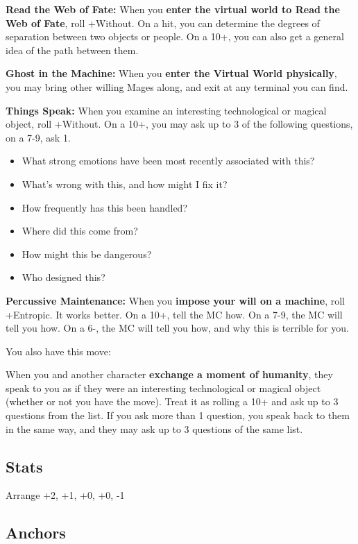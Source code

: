 \documentclass[
  oneside,
  statementpaper,
  9pt]{memoir}
\begin{document}
\textbf{Read the Web of Fate:} When you \textbf{enter the virtual world
to Read the Web of Fate}, roll +Without. On a hit, you can determine the
degrees of separation between two objects or people. On a 10+, you can
also get a general idea of the path between them.

\textbf{Ghost in the Machine:} When you \textbf{enter the Virtual World
physically}, you may bring other willing Mages along, and exit at any
terminal you can find.

\textbf{Things Speak:} When you examine an interesting technological or
magical object, roll +Without. On a 10+, you may ask up to 3 of the
following questions, on a 7-9, ask 1.

\begin{itemize}
\tightlist
\item
  What strong emotions have been most recently associated with this?
\item
  What's wrong with this, and how might I fix it?
\item
  How frequently has this been handled?
\item
  Where did this come from?
\item
  How might this be dangerous?
\item
  Who designed this?
\end{itemize}

\textbf{Percussive Maintenance:} When you \textbf{impose your will on a
machine}, roll +Entropic. It works better. On a 10+, tell the MC how. On
a 7-9, the MC will tell you how. On a 6-, the MC will tell you how, and
why this is terrible for you.

You also have this move:

When you and another character \textbf{exchange a moment of humanity},
they speak to you as if they were an interesting technological or
magical object (whether or not you have the move). Treat it as rolling a
10+ and ask up to 3 questions from the list. If you ask more than 1
question, you speak back to them in the same way, and they may ask up to
3 questions of the same list.

\hypertarget{stats-8}{%
\subsection{Stats}\label{stats-8}}

Arrange +2, +1, +0, +0, -1

\hypertarget{anchors-8}{%
\subsection{Anchors}\label{anchors-8}}
\end{document}
